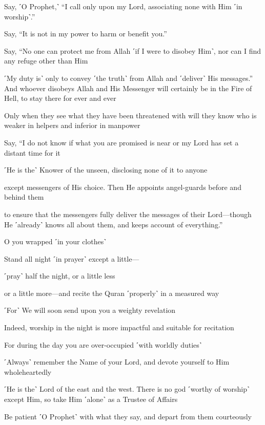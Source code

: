 Say, ˹O Prophet,˺ “I call only upon my Lord, associating none with Him ˹in worship˺.”

Say, “It is not in my power to harm or benefit you.”

Say, “No one can protect me from Allah ˹if I were to disobey Him˺, nor can I find any refuge other than Him

˹My duty is˺ only to convey ˹the truth˺ from Allah and ˹deliver˺ His messages.” And whoever disobeys Allah and His Messenger will certainly be in the Fire of Hell, to stay there for ever and ever

Only when they see what they have been threatened with will they know who is weaker in helpers and inferior in manpower

Say, “I do not know if what you are promised is near or my Lord has set a distant time for it

˹He is the˺ Knower of the unseen, disclosing none of it to anyone

except messengers of His choice. Then He appoints angel-guards before and behind them

to ensure that the messengers fully deliver the messages of their Lord—though He ˹already˺ knows all about them, and keeps account of everything.”

O you wrapped ˹in your clothes˺

Stand all night ˹in prayer˺ except a little—

˹pray˺ half the night, or a little less

or a little more—and recite the Quran ˹properly˺ in a measured way

˹For˺ We will soon send upon you a weighty revelation

Indeed, worship in the night is more impactful and suitable for recitation

For during the day you are over-occupied ˹with worldly duties˺

˹Always˺ remember the Name of your Lord, and devote yourself to Him wholeheartedly

˹He is the˺ Lord of the east and the west. There is no god ˹worthy of worship˺ except Him, so take Him ˹alone˺ as a Trustee of Affairs

Be patient ˹O Prophet˺ with what they say, and depart from them courteously

